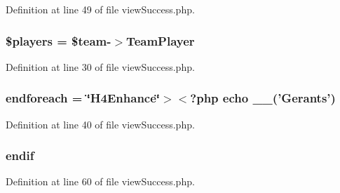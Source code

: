 Definition at line 49 of file view\-Success.\-php.

\hypertarget{live_2modules_2team_2templates_2view_success_8php_a220718bf3fb2324837cf23ba63ef457f}{
\subsubsection[{\$players}]{\setlength{\rightskip}{0pt plus 5cm}\$players = \$team-\/$>$Team\-Player}}\label{live_2modules_2team_2templates_2view_success_8php_a220718bf3fb2324837cf23ba63ef457f}


Definition at line 30 of file view\-Success.\-php.

\hypertarget{live_2modules_2team_2templates_2view_success_8php_a672d9707ef91db026c210f98cc601123}{
\subsubsection[{endforeach}]{\setlength{\rightskip}{0pt plus 5cm}endforeach = \char`\"{}H4\-Enhance\char`\"{}$>$$<$?php echo \-\_\-\-\_\-('Gerants')}}\label{live_2modules_2team_2templates_2view_success_8php_a672d9707ef91db026c210f98cc601123}


Definition at line 40 of file view\-Success.\-php.

\hypertarget{live_2modules_2team_2templates_2view_success_8php_a82cd33ca97ff99f2fcc5e9c81d65251b}{
\subsubsection[{endif}]{\setlength{\rightskip}{0pt plus 5cm}endif}}\label{live_2modules_2team_2templates_2view_success_8php_a82cd33ca97ff99f2fcc5e9c81d65251b}


Definition at line 60 of file view\-Success.\-php.

